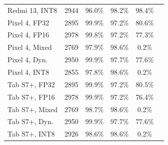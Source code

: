 \begin{table}[!t]
\begin{tabular}{@{}lrcccc@{}}
Redmi 13, INT8 & 2944 & 96.0\% & 98.2\% & 98.4\% & \\
Pixel 4, FP32 & 2895 & 99.9\% & 97.2\% & 80.6\% & \\
Pixel 4, FP16 & 2978 & 99.8\% & 97.2\% & 77.3\% & \\
Pixel 4, Mixed & 2769 & 97.9\% & 98.6\% & 0.2\% & \\
Pixel 4, Dyn. & 2950 & 99.9\% & 97.7\% & 77.6\% & \\
Pixel 4, INT8 & 2855 & 97.8\% & 98.6\% & 0.2\% & \\
Tab S7+, FP32 & 2895 & 99.9\% & 97.2\% & 80.5\% & \\
Tab S7+, FP16 & 2978 & 99.9\% & 97.2\% & 76.4\% & \\
Tab S7+, Mixed & 2769 & 98.7\% & 98.6\% & 0.2\% & \\
Tab S7+, Dyn. & 2950 & 99.9\% & 97.7\% & 77.6\% & \\
Tab S7+, INT8 & 2926 & 98.6\% & 98.6\% & 0.2\% & \\
\bottomrule
\end{tabular}
\end{table}

